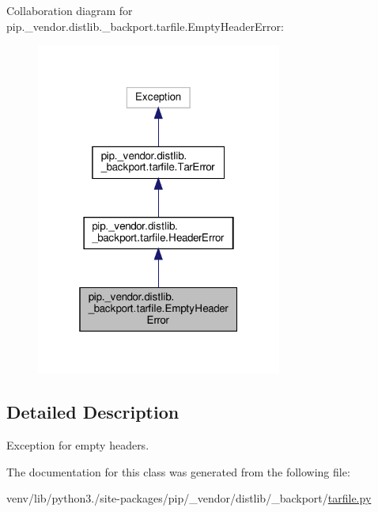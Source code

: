 Collaboration diagram for pip.\+\_\+vendor.\+distlib.\+\_\+backport.\+tarfile.\+Empty\+Header\+Error\+:
\nopagebreak
\begin{figure}[H]
\begin{center}
\leavevmode
\includegraphics[width=229pt]{classpip_1_1__vendor_1_1distlib_1_1__backport_1_1tarfile_1_1EmptyHeaderError__coll__graph}
\end{center}
\end{figure}


\subsection{Detailed Description}
\begin{DoxyVerb}Exception for empty headers.\end{DoxyVerb}
 

The documentation for this class was generated from the following file\+:\begin{DoxyCompactItemize}
\item 
venv/lib/python3./site-\/packages/pip/\+\_\+vendor/distlib/\+\_\+backport/\hyperlink{tarfile_8py}{tarfile.\+py}\end{DoxyCompactItemize}
